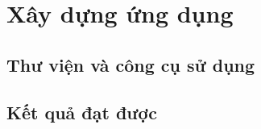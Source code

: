 \section{Xây dựng ứng dụng}
\label{sec:xaydung}

\subsection*{Thư viện và công cụ sử dụng}
\label{sec:moitruong}

\BangCongNghe

\HinhCauTrucMa

\subsection*{Kết quả đạt được}
\label{subsec:ketquadatduoc}
\label{sec:caidat-hopdong}
\label{sec:caidat-backend}


